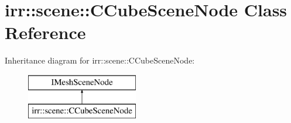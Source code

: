 \hypertarget{classirr_1_1scene_1_1_c_cube_scene_node}{\section{irr\-:\-:scene\-:\-:C\-Cube\-Scene\-Node Class Reference}
\label{classirr_1_1scene_1_1_c_cube_scene_node}
}
Inheritance diagram for irr\-:\-:scene\-:\-:C\-Cube\-Scene\-Node\-:\begin{figure}[H]
\begin{center}
\leavevmode
\includegraphics[height=2.000000cm]{classirr_1_1scene_1_1_c_cube_scene_node}
\end{center}
\end{figure}
